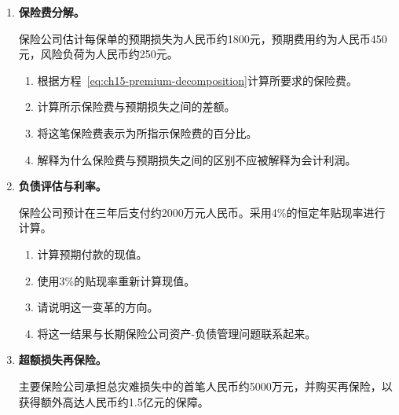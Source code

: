 \begin{enumerate}
\begin{enumerate}
\item 计算每个案例中被保险人所承担的损失金额。

\item 解释免赔额如何影响投保人在首次损失中仅获得部分赔偿的激励措施。

\end{enumerate}

\item \textbf{保险费分解。}

保险公司估计每保单的预期损失为人民币约1800元，预期费用约为人民币450元，风险负荷为人民币约250元。

\begin{enumerate}

\item 根据方程~\ref{eq:ch15-premium-decomposition}计算所要求的保险费。

\item 计算所示保险费与预期损失之间的差额。

\item 将这笔保险费表示为所指示保险费的百分比。

\item 解释为什么保险费与预期损失之间的区别不应被解释为会计利润。

\end{enumerate}

\item \textbf{负债评估与利率。}

保险公司预计在三年后支付约2000万元人民币。采用4\%的恒定年贴现率进行计算。

\begin{enumerate}

\item 计算预期付款的现值。

\item 使用3\%的贴现率重新计算现值。

\item 请说明这一变革的方向。

\item 将这一结果与长期保险公司资产-负债管理问题联系起来。

\end{enumerate}

\item \textbf{超额损失再保险。}

主要保险公司承担总灾难损失中的首笔人民币约5000万元，并购买再保险，以获得额外高达人民币约1.5亿元的保障。

\begin{enumerate}


\end{enumerate}
\end{enumerate}
